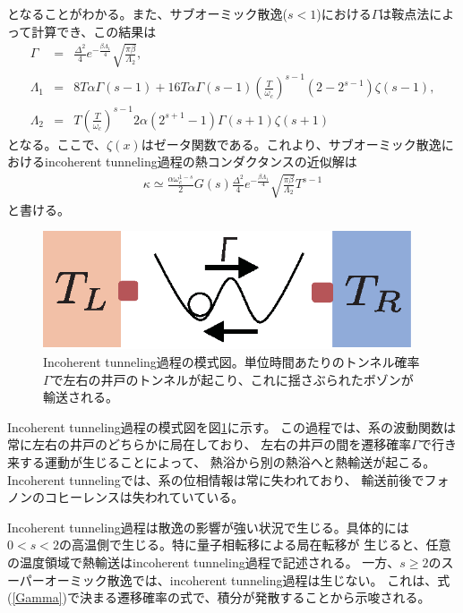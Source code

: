 となることがわかる。また、サブオーミック散逸($s<1$)における$\Gamma$は鞍点法によって計算でき、この結果は
\begin{eqnarray}
	\Gamma&=&\frac{\Delta^2}{4}e^{-\frac{\beta \Lambda_1}{4}}\sqrt{\frac{\pi \beta}{\Lambda_2}},\\
	 \Lambda_1&=&8T\alpha\Gamma(s-1)+16T\alpha\Gamma(s-1)\left(\frac{T}{\omega_c}\right)^{s-1}(2-2^{s-1})\zeta(s-1),\\
	 \Lambda_2 &=&T\left(\frac{T}{\omega_c}\right)^{s-1}2\alpha(2^{s+1}-1)\Gamma(s+1)\zeta(s+1)
\end{eqnarray}
となる\cite{Weiss99}。ここで、$\zeta(x)$はゼータ関数である。これより、サブオーミック散逸におけるincoherent tunneling過程の熱コンダクタンスの近似解は
\begin{eqnarray}
	\kappa\simeq\frac{\alpha\omega_c^{1-s}}{2}G(s)\frac{\Delta^2}{4}e^{-\frac{\beta \Lambda_1}{4}}\sqrt{\frac{\pi \beta}{\Lambda_2}}T^{s-1} 
	\label{sub_ohmic_hightemp}
\end{eqnarray}
と書ける。
\begin{figure}[tb]
	\centering
	\includegraphics[height=3.5cm]{incoherent_tunneling.eps}
	\caption{Incoherent tunneling過程の模式図。単位時間あたりのトンネル確率$\Gamma$で左右の井戸のトンネルが起こり、これに揺さぶられたボゾンが輸送される。}
	\label{fig:incoherent_tunneling}
\end{figure}

Incoherent tunneling過程の模式図を図\ref{fig:incoherent_tunneling}に示す。
この過程では、系の波動関数は常に左右の井戸のどちらかに局在しており、
左右の井戸の間を遷移確率$\Gamma$で行き来する運動が生じることによって、
熱浴から別の熱浴へと熱輸送が起こる。
Incoherent tunnelingでは、系の位相情報は常に失われており、
輸送前後でフォノンのコヒーレンスは失われていている。

Incoherent tunneling過程は散逸の影響が強い状況で生じる。具体的には
$0<s<2$の高温側で生じる。特に量子相転移による局在転移が
生じると、任意の温度領域で熱輸送はincoherent tunneling過程で記述される。
一方、$s\geq2$のスーパーオーミック散逸では、incoherent tunneling過程は生じない。
これは、式(\ref{Gamma})で決まる遷移確率の式で、積分が発散することから示唆される。